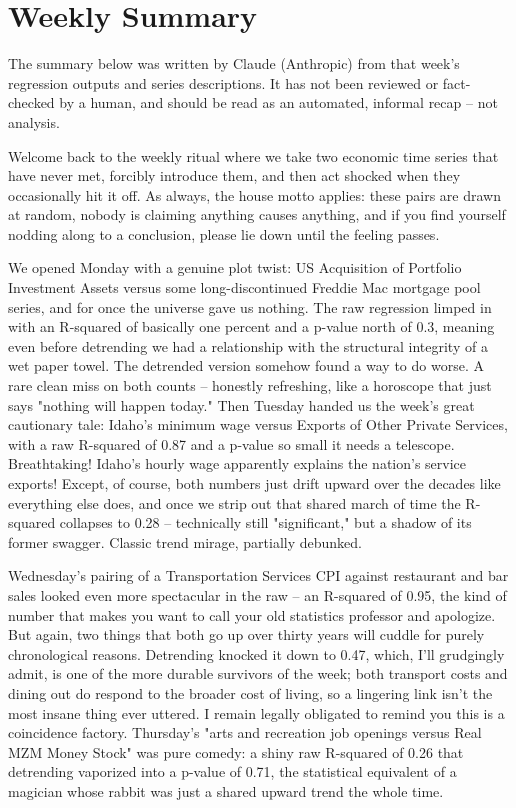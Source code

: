 \section{Weekly Summary}

\begin{tcolorbox}[colback=yellow!10,colframe=black!50,title=AI-Generated Content]
\noindent The summary below was written by Claude (Anthropic) from that week's regression outputs and series descriptions. It has not been reviewed or fact-checked by a human, and should be read as an automated, informal recap -- not analysis.
\end{tcolorbox}

Welcome back to the weekly ritual where we take two economic time series that have never met, forcibly introduce them, and then act shocked when they occasionally hit it off. As always, the house motto applies: these pairs are drawn at random, nobody is claiming anything causes anything, and if you find yourself nodding along to a conclusion, please lie down until the feeling passes.

We opened Monday with a genuine plot twist: US Acquisition of Portfolio Investment Assets versus some long-discontinued Freddie Mac mortgage pool series, and for once the universe gave us nothing. The raw regression limped in with an R-squared of basically one percent and a p-value north of 0.3, meaning even before detrending we had a relationship with the structural integrity of a wet paper towel. The detrended version somehow found a way to do worse. A rare clean miss on both counts -- honestly refreshing, like a horoscope that just says "nothing will happen today." Then Tuesday handed us the week's great cautionary tale: Idaho's minimum wage versus Exports of Other Private Services, with a raw R-squared of 0.87 and a p-value so small it needs a telescope. Breathtaking! Idaho's hourly wage apparently explains the nation's service exports! Except, of course, both numbers just drift upward over the decades like everything else does, and once we strip out that shared march of time the R-squared collapses to 0.28 -- technically still "significant," but a shadow of its former swagger. Classic trend mirage, partially debunked.

Wednesday's pairing of a Transportation Services CPI against restaurant and bar sales looked even more spectacular in the raw -- an R-squared of 0.95, the kind of number that makes you want to call your old statistics professor and apologize. But again, two things that both go up over thirty years will cuddle for purely chronological reasons. Detrending knocked it down to 0.47, which, I'll grudgingly admit, is one of the more durable survivors of the week; both transport costs and dining out do respond to the broader cost of living, so a lingering link isn't the most insane thing ever uttered. I remain legally obligated to remind you this is a coincidence factory. Thursday's "arts and recreation job openings versus Real MZM Money Stock" was pure comedy: a shiny raw R-squared of 0.26 that detrending vaporized into a p-value of 0.71, the statistical equivalent of a magician whose rabbit was just a shared upward trend the whole time.

